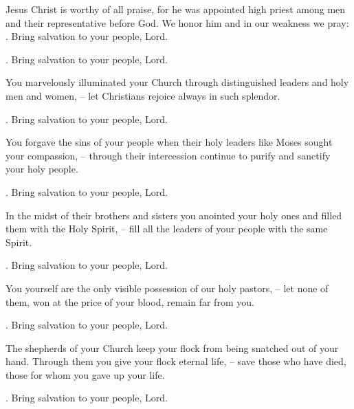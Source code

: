 \lettrine[loversize=0.15,lines=2]{J}{}esus Christ is worthy of all praise, for he was appointed high priest among men and their representative before God. We honor him and in our weakness we pray: \Rbar. Bring salvation to your people, Lord.
\par \Rbar. Bring salvation to your people, Lord.

You marvelously illuminated your Church through distinguished leaders and holy men and women,
– let Christians rejoice always in such splendor.
\par \Rbar. Bring salvation to your people, Lord.

You forgave the sins of your people when their holy leaders like Moses sought your compassion,
– through their intercession continue to purify and sanctify your holy people.
\par \Rbar. Bring salvation to your people, Lord.

In the midst of their brothers and sisters you anointed your holy ones and filled them with the Holy Spirit,
– fill all the leaders of your people with the same Spirit.
\par \Rbar. Bring salvation to your people, Lord.

You yourself are the only visible possession of our holy pastors,
– let none of them, won at the price of your blood, remain far from you.
\par \Rbar. Bring salvation to your people, Lord.

The shepherds of your Church keep your flock from being snatched out of your hand. Through them you give your flock eternal life,
– save those who have died, those for whom you gave up your life.
\par \Rbar. Bring salvation to your people, Lord.